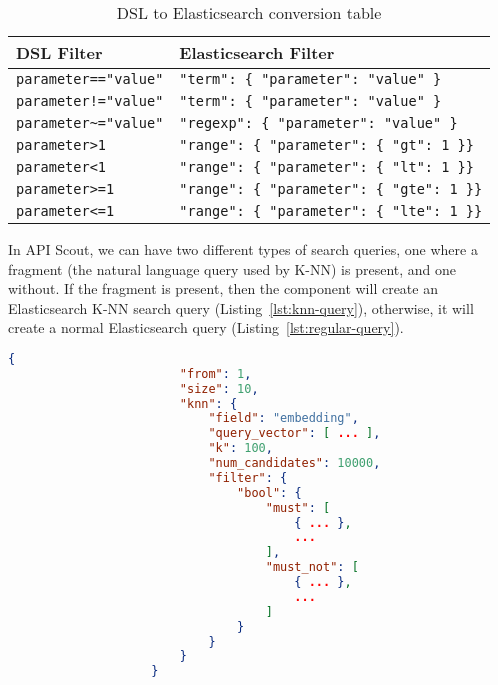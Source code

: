 \begin{table}[!h]
    \begin{center}
        \begin{tabular}{l l}
            \hline
            \textbf{DSL Filter} & \textbf{Elasticsearch Filter} \\ \hline
            \verb|parameter=="value"| & \verb|"term": { "parameter": "value" }| \\
            \verb|parameter!="value"| & \verb|"term": { "parameter": "value" }| \\
            \verb|parameter~="value"| & \verb|"regexp": { "parameter": "value" }| \\
            \verb|parameter>1| & \verb|"range": { "parameter": { "gt": 1 }}| \\
            \verb|parameter<1| & \verb|"range": { "parameter": { "lt": 1 }}| \\
            \verb|parameter>=1| & \verb|"range": { "parameter": { "gte": 1 }}| \\
            \verb|parameter<=1| & \verb|"range": { "parameter": { "lte": 1 }}| \\ \hline
        \end{tabular}
    \end{center}

    \caption{DSL to Elasticsearch conversion table}
    \label{tab:dsl-to-es}
\end{table}

\noindent In API Scout, we can have two different types of search queries, one where a fragment (the natural language query used by K-NN) is present, and one without.
If the fragment is present, then the component will create an Elasticsearch K-NN search query (Listing~\ref{lst:knn-query}), otherwise, it will create a normal Elasticsearch query (Listing~\ref{lst:regular-query}).

\begin{center}
    \begin{lstlisting}[label={lst:knn-query},language=json,caption={Structure of an Elasticsearch K-NN query},captionpos=b]
                    {
                        "from": 1,
                        "size": 10,
                        "knn": {
                            "field": "embedding",
                            "query_vector": [ ... ],
                            "k": 100,
                            "num_candidates": 10000,
                            "filter": {
                                "bool": {
                                    "must": [
                                        { ... },
                                        ...
                                    ],
                                    "must_not": [
                                        { ... },
                                        ...
                                    ]
                                }
                            }
                        }
                    }
    \end{lstlisting}
\end{center}

